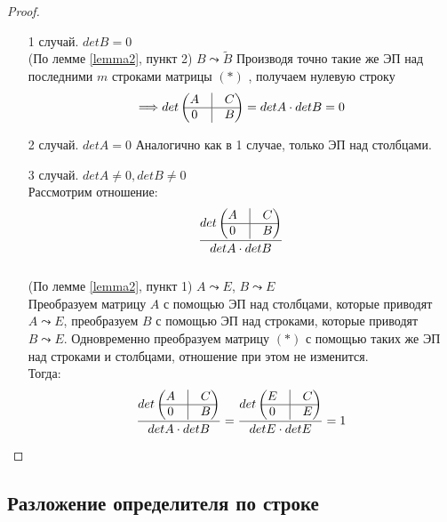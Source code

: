 \documentclass[a4paper, 12pt]{article}
\newcommand\tab[1][.5cm]{\hspace*{#1}}
\theoremstyle{definition}
\begin{document}
  \begin{proof} \tab
    \begin{itemize}
      \item[1 случай.] $detB = 0$ \\
      (По лемме \eqref{lemma2}, пункт 2) $B\leadsto \widetilde{B}$ 
      Производя точно такие же ЭП над последними $m$ строками матрицы $(*)$ , получаем нулевую строку $$\Longrightarrow det \begin{pmatrix}
        A & \vline & C \\
        \hline
        0 & \vline & B
      \end{pmatrix} = detA \cdot detB = 0$$  
      \item[2 случай.] $detA = 0$ Аналогично как в 1 случае, только ЭП над столбцами. 
      \item[3 случай.] $detA \not = 0, detB \not = 0$ \\
      Рассмотрим отношение:
      $$\frac{det \begin{pmatrix}
        A & \vline & C \\
        \hline
        0 & \vline & B
      \end{pmatrix}}{detA \cdot detB}$$\\ (По лемме \eqref{lemma2}, пункт 1) $A\leadsto E$, $B\leadsto E$ \\
      Преобразуем матрицу $A$ с помощью ЭП над столбцами, которые приводят $A \leadsto E$, преобразуем $B$ с помощью ЭП над строками, которые приводят $B \leadsto E$. Одновременно преобразуем матрицу $(*)$ с помощью таких же ЭП над строками и столбцами, отношение при этом не изменится. \\
      Тогда: 
      $$\frac{det \begin{pmatrix}
        A & \vline & C \\
        \hline
        0 & \vline & B
      \end{pmatrix}}{detA \cdot detB} =
      \frac{det \begin{pmatrix}
        E & \vline & C \\
        \hline
        0 & \vline & E
      \end{pmatrix}}{detE \cdot detE} = 1$$    
    \end{itemize}
  \end{proof} 

  \subsection{Разложение определителя по строке}
\end{document}
